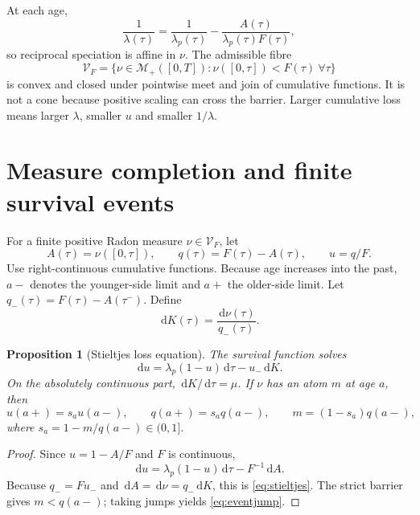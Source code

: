 \documentclass[11pt]{article}
\newtheorem{proposition}[theorem]{Proposition}
\theoremstyle{definition}
\newcommand{\M}{\mathcal{M}}
\newcommand{\V}{\mathcal{V}}
\newcommand{\dd}{\,\mathrm{d}}
\begin{document}
At each age,
\begin{equation}
 \frac1{\lambda(\tau)}=\frac1{\lambda_p(\tau)}-
 \frac{A(\tau)}{\lambda_p(\tau)F(\tau)}, \label{eq:affine}
\end{equation}
so reciprocal speciation is affine in $\nu$. The admissible fibre
\begin{equation}
 \V_F=\{\nu\in\M_+([0,T]):\nu([0,\tau])<F(\tau)\ \forall\tau\} \label{eq:fibre}
\end{equation}
is convex and closed under pointwise meet and join of cumulative functions. It is not a cone because positive scaling can cross the barrier. Larger cumulative loss means larger $\lambda$, smaller $u$ and smaller $1/\lambda$.

\section{Measure completion and finite survival events}
For a finite positive Radon measure $\nu\in\V_F$, let
\begin{equation}
 A(\tau)=\nu([0,\tau]),\qquad q(\tau)=F(\tau)-A(\tau),\qquad u=q/F. \label{eq:q}
\end{equation}
Use right-continuous cumulative functions. Because age increases into the past, $a-$ denotes the younger-side limit and $a+$ the older-side limit. Let $q_-(\tau)=F(\tau)-A(\tau^-)$. Define
\begin{equation}
 \dd K(\tau)=\frac{\dd\nu(\tau)}{q_-(\tau)}. \label{eq:K}
\end{equation}

\begin{proposition}[Stieltjes loss equation]\label{prop:stieltjes}
The survival function solves
\begin{equation}
 \dd u=\lambda_p(1-u)\dd\tau-u_-\dd K. \label{eq:stieltjes}
\end{equation}
On the absolutely continuous part, $\dd K/\dd\tau=\mu$. If $\nu$ has an atom $m$ at age $a$, then
\begin{equation}
 u(a+)=s_au(a-),\qquad q(a+)=s_aq(a-),\qquad
 m=(1-s_a)q(a-), \label{eq:eventjump}
\end{equation}
where $s_a=1-m/q(a-)\in(0,1]$.
\end{proposition}

\begin{proof}
Since $u=1-A/F$ and $F$ is continuous,
\[
 \dd u=\lambda_p(1-u)\dd\tau-F^{-1}\dd A.
\]
Because $q_-=Fu_-$ and $\dd A=\dd\nu=q_-\dd K$, this is \eqref{eq:stieltjes}. The strict barrier gives $m<q(a-)$; taking jumps yields \eqref{eq:eventjump}.
\end{proof}
\end{document}
